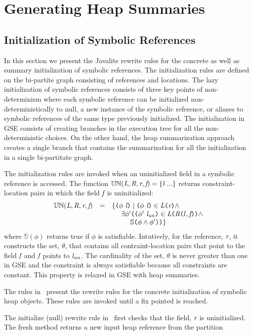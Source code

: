 \section{Generating Heap Summaries}

\subsection{Initialization of Symbolic References}

In this section we present the Javalite rewrite rules for the concrete
as well as summary initialization of symbolic references. The
initialization rules are defined on the bi-partite graph consisting of
references and locations. The lazy initialization of symbolic
references consists of three key points of non-determinism where each
symbolic reference can be initialized non-deterministically to null, a
new instance of the symbolic reference, or aliases to symbolic
references of the same type previously initialized. The initialization
in GSE consists of creating branches in the execution tree for all the
non-deterministic choices. On the other hand, the heap summarization
approach creates a single branch that contains the summarization for
all the initialization in a single bi-partitate graph.





The initialization rules are invoked when an uninitialized field in a
symbolic reference is accessed. The function $\mathbb{UN}(\emph{L},
\emph{R}, \emph{r}, \emph{f}) = \{\emph{l}\ ...\}$ returns
constraint-location pairs in which the field $\emph{f}$ is
uninitialized:
\[
\begin{array}{rcl}
\mathbb{UN}(\cfgnt{L}, \cfgnt{R}, \cfgnt{r}, \cfgnt{f}) & = &\{ \lp\phi\ \cfgnt{l}\rp \mid \lp \phi\ \cfgnt{l}\rp  \in \cfgnt{L}\lp \cfgnt{r}\rp  \wedge \\
& & \ \ \ \ \exists \phi^\prime \lp \lp \phi^\prime\ \cfgnt{l}_\mathit{un}\rp  \in \cfgnt{L}\lp \cfgnt{R}\lp l,\cfgnt{f}\rp\rp \wedge \\
& & \ \ \ \ \ \ \ \ \mathbb{S}\lp \phi \wedge \phi^\prime \rp\rp\}\\
\end{array}
\]
where $\mathbb{S}(\phi)$ returns true if $\phi$ is
satisfiable. Intutively, for the reference, $\emph{r}$, it constructs
the set, $\theta$, that contains all contraint-location pairs that
point to the field $\emph{f}$ and $\emph{f}$ points to
$\emph{l}_\mathit{un}$. The cardinality of the set, $\theta$ is never
greater than one in GSE and the constraint is always satisfiable
because all constraints are constant. This property is relaxed in GSE
with heap summaries.

The rules in~ present the rewrite rules for the
concrete initialization of symbolic heap objects.  These rules are
invoked until a fix pointed is reached. 

The initialize (null) rewrite rule in~ first
checks that the field, $\emph{r}$ is uninitialized. The fresh method
returns a new input heap reference from the partition 



